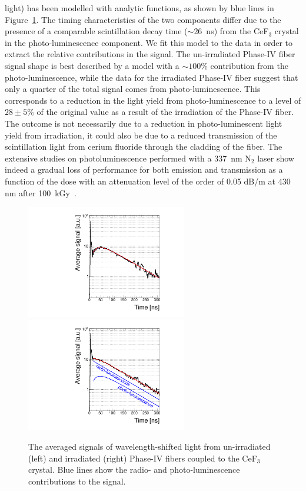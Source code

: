 \documentclass[a4paper,11pt]{article}
\begin{document}
light) has been modelled with analytic functions, as shown by blue lines in Figure~\ref{fig:CeF3signals}. The timing characteristics of the two components differ due to the presence of a comparable scintillation decay time ($\sim$26~ns) from the CeF$_3$ crystal in the photo-luminescence component. We fit this model to the data in order to extract the relative contributions in the signal. The un-irradiated Phase-IV fiber signal shape is best described by a model with a $\sim100$\% contribution from the photo-luminescence, while the data for the irradiated Phase-IV fiber suggest that only a quarter of the total signal comes from photo-luminescence. This corresponds to a reduction in the light yield from photo-luminescence to a level of $28 \pm 5$\% of the original value as a result of the irradiation of the Phase-IV fiber. The outcome is not necessarily due to a reduction in photo-luminescent light yield from irradiation, it could also be due to a reduced transmission of the scintillation light from cerium fluoride through the cladding of the fiber. The extensive studies on photoluminescence performed with a 337~nm N$_2$ laser show indeed a gradual loss of performance for both emission and transmission as a function of the dose with an attenuation level of the order of 0.05 dB/m at 430 nm after 100~kGy~\cite{JINSTPaper2}.

\begin{figure}[ht]
\begin{center}
        \includegraphics[width=7cm]{Figures/CeF3coupledFibersUnirrad.pdf}
        \includegraphics[width=7cm]{Figures/CeF3coupledFibersIrrad.pdf}
    \caption{\small The averaged signals of wavelength-shifted light from un-irradiated (left) and irradiated (right) Phase-IV fibers coupled to the CeF$_3$ crystal. Blue lines show the radio- and photo-luminescence contributions to the signal. }
    \label{fig:CeF3signals}
\end{center}
\end{figure}
\end{document}
